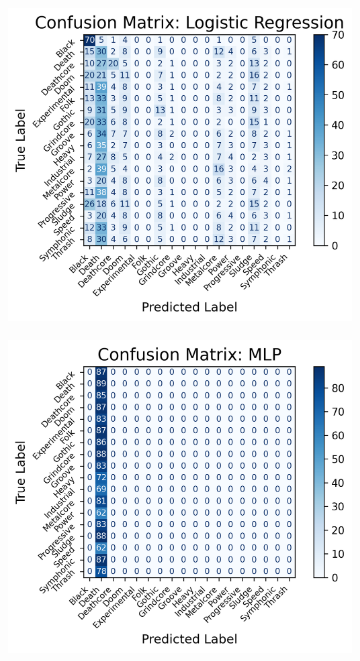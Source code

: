 \begin{figure}[h!]
\begin{subfigure}[b]{0.45\textwidth}
        \label{fig:subfig2}
    \end{subfigure}
    \begin{subfigure}[b]{0.45\textwidth}
        \centering
        \includegraphics[width=\textwidth]{figures/confusion_matrix_Logistic Regression.png}
        \label{fig:subfig3}
    \end{subfigure}
    \hfill
    \begin{subfigure}[b]{0.45\textwidth}
        \centering
        \includegraphics[width=\textwidth]{figures/confusion_matrix_MLP.png}

\end{subfigure}
\end{figure}
